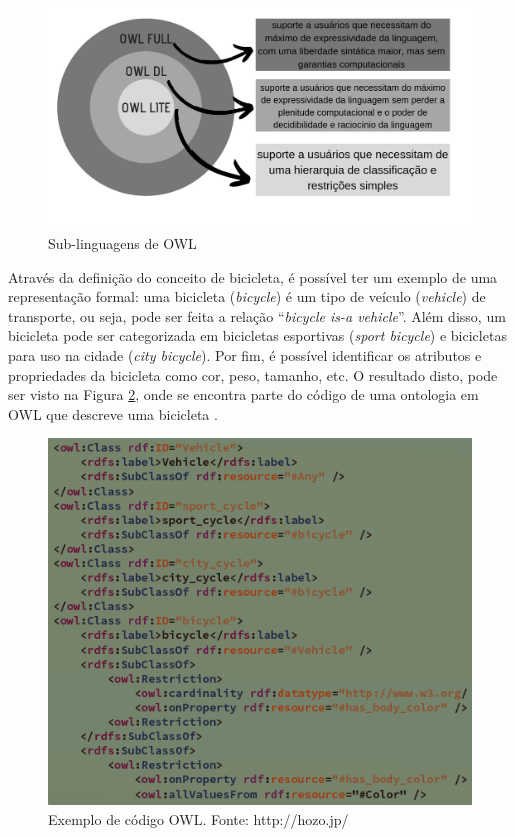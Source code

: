 \documentclass{bcc}
\begin{document}
\begin{figure}[H]
\centering
\includegraphics[width=.9\textwidth]{Figuras/owl_sub.png}
\caption{Sub-linguagens de OWL}
\label{fig:owlsub}
\end{figure}

Através da definição do conceito de bicicleta, é possível ter um exemplo de uma representação formal: uma bicicleta (\textit{bicycle}) é um tipo de veículo (\textit{vehicle}) de transporte, ou seja, pode ser feita a relação “\textit{bicycle is-a vehicle}”. Além disso, um bicicleta pode ser categorizada em bicicletas esportivas (\textit{sport bicycle}) e bicicletas para uso na cidade (\textit{city bicycle}). Por fim, é possível identificar os atributos e propriedades da bicicleta como cor, peso, tamanho, etc. O resultado disto, pode ser visto na Figura \ref{fig:codowl}, onde se encontra parte do código de uma ontologia em OWL que descreve uma bicicleta \cite{isotani2015}.


\begin{figure}[H]
\centering
\includegraphics[width=.9\textwidth]{Figuras/codigo_owl.png}
\caption{Exemplo de código OWL. Fonte: http://hozo.jp/}
\label{fig:codowl}
\end{figure}
\end{document}
